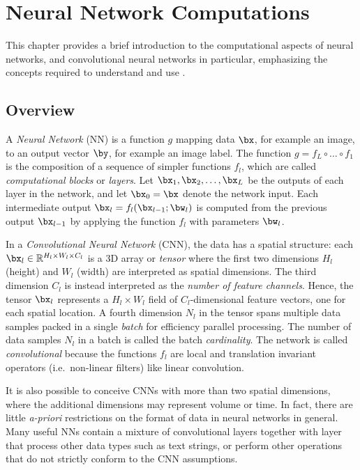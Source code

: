 \chapter{Neural Network Computations}\label{s:fundamentals}

This chapter provides a brief introduction to the computational aspects of neural networks, and convolutional neural networks in particular, emphasizing the concepts required to understand and use \matconvnet.

\section{Overview}\label{s:cnn-structure}

A \emph{Neural Network} (NN) is a function $g$ mapping data $\bx$, for example an image, to an output vector $\by$, for example an image label. The function $g=f_L \circ \dots \circ f_1$ is the composition of a sequence of simpler functions $f_l$, which are called \emph{computational blocks} or \emph{layers}. Let $\bx_1,\bx_2,\dots,\bx_L$ be the outputs of each layer in the network, and let $\bx_0=\bx$ denote the network input. Each intermediate output $\bx_l = f_l(\bx_{l-1};\bw_l)$ is computed from the previous output $\bx_{l-1}$  by applying the function $f_l$ with parameters $\bw_l$. 

In a \emph{Convolutional Neural Network} (CNN), the data has a spatial structure: each $\bx_l\in\mathbb{R}^{H_l \times W_l \times C_l}$ is a 3D array or \emph{tensor} where the first two dimensions $H_l$ (height) and $W_l$ (width) are interpreted as spatial dimensions. The third dimension $C_l$ is instead interpreted as the \emph{number of feature channels}. Hence, the tensor $\bx_l$ represents a $H_l \times W_l$ field of $C_l$-dimensional feature vectors, one for each spatial location. A fourth dimension $N_l$ in the tensor spans multiple data samples packed in a single \emph{batch} for efficiency parallel processing. The number of data samples $N_l$ in a batch is called the batch \emph{cardinality}. The network is called \emph{convolutional} because the functions $f_l$ are local and translation invariant operators (i.e.\ non-linear filters) like linear convolution.

It is also possible to conceive CNNs with more than two spatial dimensions, where the additional dimensions may represent volume or time. In fact, there are little \emph{a-priori} restrictions on the format of data in neural networks in general. Many useful NNs contain a mixture of convolutional layers together with layer that process other data types such as text strings, or perform other operations that do not strictly conform  to the CNN assumptions.

